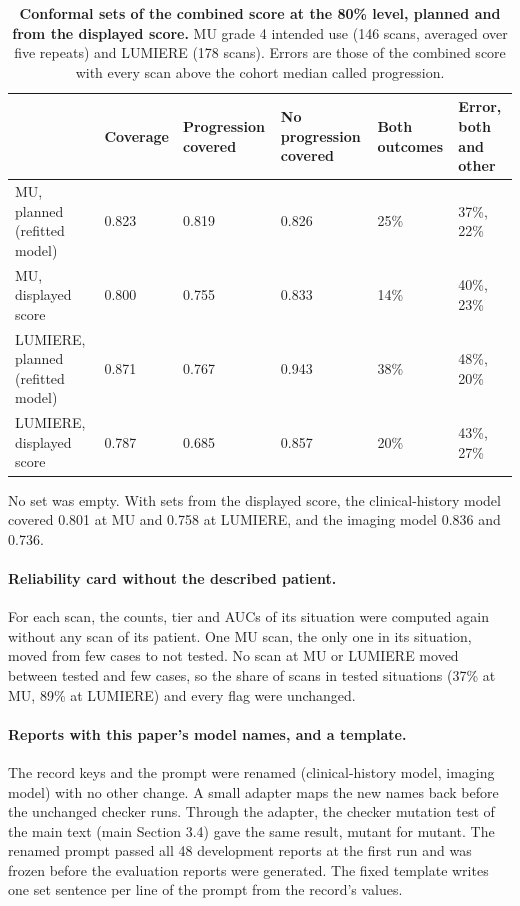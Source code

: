 \documentclass[11pt,a4paper]{article}
\begin{document}
\begin{table}[!htbp]
\renewcommand{\thetable}{S8}\renewcommand{\theHtable}{S8}
\centering
\caption{\textbf{Conformal sets of the combined score at the 80\% level, planned and from the displayed score.} MU
grade 4 intended use (146 scans, averaged over five repeats) and LUMIERE (178 scans). Errors are those of the combined
score with every scan above the cohort median called progression.}
\label{tab:S25a}
\footnotesize
\begin{tabularx}{\linewidth}{@{}LR{1.3cm}R{1.5cm}R{1.5cm}R{1.4cm}R{1.6cm}@{}}
\toprule
 & Coverage & Progression covered & No progression covered & Both outcomes & Error, both and other \\
\midrule
MU, planned (refitted model) & 0.823 & 0.819 & 0.826 & 25\% & 37\%, 22\% \\
MU, displayed score & 0.800 & 0.755 & 0.833 & 14\% & 40\%, 23\% \\
LUMIERE, planned (refitted model) & 0.871 & 0.767 & 0.943 & 38\% & 48\%, 20\% \\
LUMIERE, displayed score & 0.787 & 0.685 & 0.857 & 20\% & 43\%, 27\% \\
\bottomrule
\end{tabularx}
\end{table}

No set was empty. With sets from the displayed score, the clinical-history model covered 0.801 at MU and 0.758 at
LUMIERE, and the imaging model 0.836 and 0.736.

\paragraph{Reliability card without the described patient.} For each scan, the counts, tier and AUCs of its situation
were computed again without any scan of its patient. One MU scan, the only one in its situation, moved from few cases
to not tested. No scan at MU or LUMIERE moved between tested and few cases, so the share of scans in tested situations
(37\% at MU, 89\% at LUMIERE) and every flag were unchanged.

\paragraph{Reports with this paper's model names, and a template.} The record keys and the prompt were renamed
(clinical-history model, imaging model) with no other change. A small adapter maps the new names back before the
unchanged checker runs. Through the adapter, the checker mutation test of the main text (main Section 3.4) gave the same result, mutant for mutant.
The renamed prompt passed all 48 development reports at the first run and was frozen before the evaluation reports were
generated. The fixed template writes one set sentence per line of the prompt from the record's values.
\end{document}
